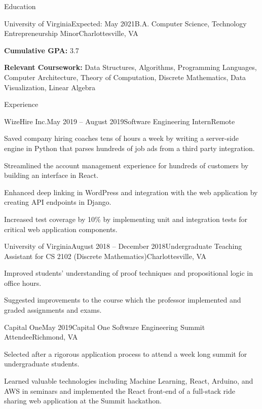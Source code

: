 \documentclass{resume}
\begin{document}
\vspace{-1em}
\begin{rSection}{Education}

  \begin{rSubsection}{University of Virginia}{Expected: May 2021}{B.A. Computer Science, Technology Entrepreneurship Minor}{Charlottesville, VA}
    \item \textbf{Cumulative GPA:} 3.7
    \item \textbf{Relevant Coursework:} Data Structures, Algorithms, Programming Languages, Computer Architecture, Theory of Computation, Discrete Mathematics, Data Visualization, Linear Algebra
  \end{rSubsection}

\end{rSection}

\begin{rSection}{Experience}

  \begin{rSubsection}{WizeHire Inc.}{May 2019 -- August 2019}{Software Engineering Intern}{Remote}
    \item Saved company hiring coaches tens of hours a week by writing a server-side engine in Python that parses hundreds of job ads from a third party integration.
    \item Streamlined the account management experience for hundreds of customers by building an interface in React.
    \item Enhanced deep linking in WordPress and integration with the web application by creating API endpoints in Django.
    \item Increased test coverage by 10\% by implementing unit and integration tests for critical web application components.
  \end{rSubsection}

  \begin{rSubsection}{University of Virginia}{August 2018 -- December 2018}{Undergraduate Teaching Assistant for CS 2102 (Discrete Mathematics)}{Charlottesville, VA}
    \item Improved students' understanding of proof techniques and propositional logic in office hours.
    \item Suggested improvements to the course which the professor implemented and graded assignments and exams.
  \begin{rSubsection}{Capital One}{May 2019}{Capital One Software Engineering Summit Attendee}{Richmond, VA}
    \item Selected after a rigorous application process to attend a week long summit for undergraduate students.
    \item Learned valuable technologies including Machine Learning, React, Arduino, and AWS in seminars and implemented the React front-end of a full-stack ride sharing web application at the Summit hackathon.
  \end{rSubsection}


\end{rSubsection}
\end{rSection}
\end{document}
